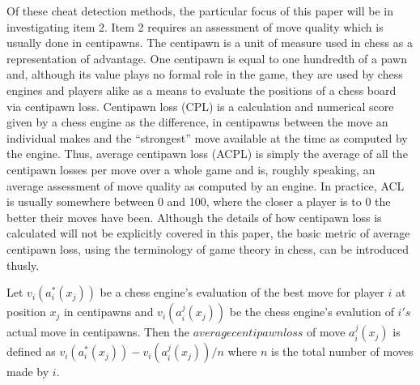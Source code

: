 \documentclass[12pt, letterpaper, titlepage]{article}
\begin{document}
Of these cheat detection methods, the particular focus of this paper will be in investigating item 2. Item 2 requires an assessment of move quality which is usually done in centipawns. The centipawn is a unit of measure used in chess as a representation of advantage. One centipawn is equal to one hundredth of a pawn and, although its value plays no formal role in the game, they are used by chess engines and players alike as a means to evaluate the positions of a chess board via centipawn loss. Centipawn loss (CPL) is a calculation and numerical score given by a chess engine as the difference, in centipawns between the move an individual makes and the “strongest” move available at the time as computed by the engine. Thus, average centipawn loss (ACPL) is simply the average of all the centipawn losses per move over a whole game and is, roughly speaking, an average assessment of move quality as computed by an engine. In practice, ACL is usually somewhere between 0 and 100, where the closer a player is to 0 the better their moves have been. Although the details of how centipawn loss is calculated will not be explicitly covered in this paper, the basic metric of average centipawn loss, using the terminology of game theory in chess, can be introduced thusly.

Let \begin{math}v_{i}(a_{i}^*(x_{j}))\end{math} be a chess engine's evaluation of the best move for player \begin{math}i\end{math} at position \begin{math}x_{j}\end{math} in centipawns and \begin{math}v_{i}(a_{i}^j(x_{j}))\end{math} be the chess engine's evalution of \begin{math}i's\end{math} actual move in centipawns. Then the \begin{math}average centipawn loss\end{math} of move \begin{math}a_{i}^j(x_{j})\end{math} is defined as \begin{math}v_{i}(a_{i}^*(x_{j})) - v_{i}(a_{i}^j(x_{j}))/n\end{math} where \begin{math}n\end{math} is the total number of moves made by \begin{math}i\end{math}.
\end{document}
